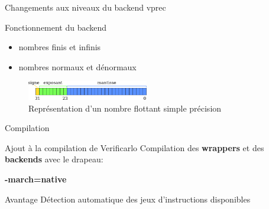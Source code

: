 \documentclass{beamer}
\begin{document}
\begin{frame}{Changements aux niveaux du backend vprec}

  \begin{block}{Fonctionnement du backend}
    \begin{itemize}
    \item nombres finis et infinis
    \item nombres normaux et dénormaux
    \end{itemize}
  \end{block}

  \begin{figure}
    \centering
    \includegraphics[width=200px]{../ressources/IEEE754_simple_precision.png}
    \caption{\label{fig:ieee_simple_precision}Représentation d'un nombre flottant simple précision}
  \end{figure}

\end{frame}

\begin{frame}{Compilation}

  \begin{block}{Ajout à la compilation de Verificarlo}
    Compilation des \textbf{wrappers} et des \textbf{backends} avec le drapeau:
    \begin{center}
      \textbf{-march=native}
    \end{center}
  \end{block}

  \begin{block}{Avantage}
    Détection automatique des jeux d'instructions disponibles
  \end{block}


\end{frame}
\end{document}
